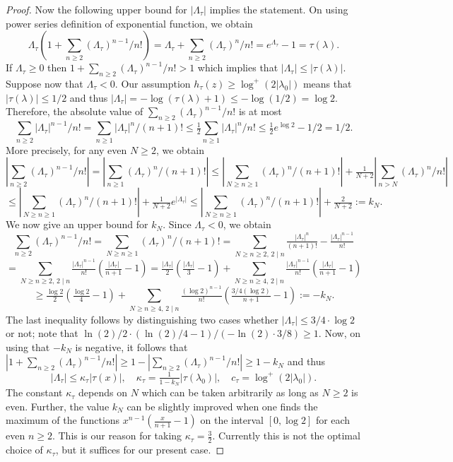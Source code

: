 \begin{proof}
Now the following upper bound for $|\Lambda_\tau|$ implies the statement. On using power series definition of exponential function, we obtain $$\Lambda_\tau(1+\sum_{n\geq 2} (\Lambda_\tau)^{n-1}/n!)=\Lambda_\tau+\sum_{n\geq 2} (\Lambda_\tau)^n/n!=e^{\Lambda_\tau}-1=\tau(\lambda).$$
If $\Lambda_\tau\geq 0$ then $1+\sum_{n\geq 2} (\Lambda_\tau)^{n-1}/n!>1$ which implies that $|\Lambda_\tau|\leq |\tau(\lambda)|.$ Suppose now that $\Lambda_\tau<0$. Our assumption $h_{\tau}(z)\geq \log^+ (2|\lambda_0|)$ means that $|\tau(\lambda)|\leq 1/2$ and thus $|\Lambda_\tau|=-\log (\tau(\lambda)+1)\leq -\log(1/2)=\log 2.$ Therefore, the absolute value of $\sum_{n\geq 2} (\Lambda_\tau)^{n-1}/n!$ is at most $$\sum_{n\geq 2} |\Lambda_\tau|^{n-1}/n!=\sum_{n\geq 1} |\Lambda_\tau|^{n}/(n+1)!\leq \tfrac{1}{2}\sum_{n\geq 1} |\Lambda_\tau|^{n}/n!\leq
\tfrac{1}{2}e^{\log 2}-1/2=1/2.$$
More precisely, for any even $N\geq 2$, we obtain 
$$|\sum_{n\geq 2} (\Lambda_\tau)^{n-1}/n!|=|\sum_{n\geq 1} (\Lambda_\tau)^{n}/(n+1)!|\leq |\sum_{N\geq n\geq 1} (\Lambda_\tau)^{n}/(n+1)!|+\tfrac{1}{N+2}|\sum_{n>N} (\Lambda_\tau)^{n}/n!|$$
$$\leq |\sum_{N\geq n\geq 1} (\Lambda_\tau)^{n}/(n+1)!|+\tfrac{1}{N+2}e^{|\Lambda_\tau|}\leq |\sum_{N\geq n\geq 1} (\Lambda_\tau)^{n}/(n+1)!|+\tfrac{2}{N+2}:=k_N.$$
We now give an upper bound for $k_N$. Since $\Lambda_\tau<0$, we obtain
$$\sum_{n\geq 2} (\Lambda_\tau)^{n-1}/n!=\sum_{N\geq n\geq 1} (\Lambda_\tau)^{n}/(n+1)!=\sum_{N\geq n\geq 2, \, 2\mid n}\tfrac{|\Lambda_\tau|^n}{(n+1)!}-\tfrac{|\Lambda_\tau|^{n-1}}{n!}$$
$$=\sum_{N\geq n\geq 2, \, 2\mid n}\tfrac{|\Lambda_\tau|^{n-1}}{n!}(\tfrac{|\Lambda_\tau|}{n+1}-1)=\tfrac{|\Lambda_\tau|}{2}(\tfrac{|\Lambda_\tau|}{3}-1)+\sum_{N\geq n\geq 4, \, 2\mid n}\tfrac{|\Lambda_\tau|^{n-1}}{n!}(\tfrac{|\Lambda_\tau|}{n+1}-1)$$
$$\geq \tfrac{\log 2}{2}(\tfrac{\log 2}{4}-1)+\sum_{N\geq n\geq 4, \, 2\mid n}\tfrac{(\log 2)^{n-1}}{n!}(\tfrac{3/4(\log 2)}{n+1}-1):=-k_N.$$
The last inequality follows by distinguishing two cases whether  $|\Lambda_\tau|\leq 3/4\cdot \log 2$ or not; note that $\ln(2)/2\cdot(\ln(2)/4-1)/(-\ln (2)\cdot3/8)\geq 1$.  Now, on using that $-k_N$ is negative, it follows that $|1+\sum_{n\geq 2} (\Lambda_\tau)^{n-1}/n!|\geq 1-|\sum_{n\geq 2} (\Lambda_\tau)^{n-1}/n!|\geq 1-k_N$ and thus 
$$|\Lambda_\tau|\leq \kappa_\tau|\tau(x)|, \quad \kappa_\tau=\tfrac{1}{1-k_N}|\tau(\lambda_0)|,  \quad c_\tau=\log^+(2|\lambda_0|).$$
The constant $\kappa_\tau$ depends on $N$ which can be taken arbitrarily as long as $N\geq 2$ is even. Further, the value $k_N$ can be slightly improved when one finds the maximum of the functions $x^{n-1}(\tfrac{x}{n+1}-1)$ on the interval $[0,\log 2]$ for each even $n\geq 2$. This is our reason for taking $\kappa_{\tau} = \frac{3}{2}$. Currently this is not the optimal choice of $\kappa_{\tau}$, but it suffices for our present case. 


\end{proof}
